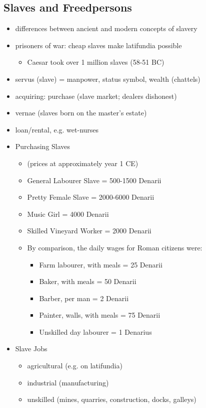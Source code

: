 \documentclass[12pt, twoside]{article}
\begin{document}
\subsection{Slaves and Freedpersons}
\begin{itemize}
\item differences between ancient and modern concepts of slavery
\item prisoners of war: cheap slaves make latifundia possible
	\begin{itemize}
	\item Caesar took over 1 million slaves (58-51 BC)
	\end{itemize}
\item servus (slave) = manpower, status symbol, wealth (chattels)
\item acquiring: purchase (slave market; dealers dishonest)
\item vernae (slaves born on the master's estate)
\item loan/rental, e.g. wet-nurses
\item Purchasing Slaves
	\begin{itemize}
	\item (prices at approximately year 1 CE)
	\item General Labourer Slave = 500-1500 Denarii
	\item Pretty Female Slave = 2000-6000 Denarii
	\item Music Girl = 4000 Denarii
	\item Skilled Vineyard Worker = 2000 Denarii
	\item By comparison, the daily wages for Roman citizens were:
		\begin{itemize}
		\item Farm labourer, with meals = 25 Denarii
		\item Baker, with meals = 50 Denarii
		\item Barber, per man = 2 Denarii
		\item Painter, walls, with meals = 75 Denarii
		\item Unskilled day labourer = 1 Denarius
		\end{itemize}
	\end{itemize}
\item Slave Jobs
	\begin{itemize}
	\item agricultural (e.g. on latifundia)
	\item industrial (manufacturing)
	\item unskilled (mines, quarries, construction, docks, galleys)

\end{itemize}
\end{itemize}
\end{document}
